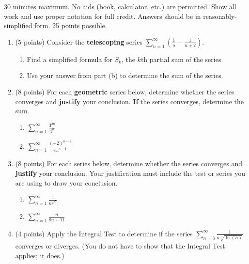 \documentclass[12pt]{article}
\newcommand{\ds}{\displaystyle}
\begin{document}
30 minutes maximum.  No aids (book, calculator, etc.) are permitted.  Show all work and use proper notation for full credit.  Answers should be in reasonably-simplified form.  25 points possible.

\begin{enumerate}
\item (5 points) Consider the \textbf{telescoping} series $\ds \sum_{n=1}^{\infty} \left( \frac{1}{n}- \frac{1}{n+2}\right).$
	\begin{enumerate}
	\item Find a simplified formula for $S_k$, the $k$th partial sum of the series.
	\vfill
	\item Use your answer from part (b) to determine the sum of the series.\\
	\vfill
	\end{enumerate}
\item (8 points) For each \textbf{geometric} series below, determine whether the series converges and \textbf{justify} your conclusion. \textbf{If} the series converges, determine the sum.
	\begin{enumerate}
	\item $\ds \sum_{n=1}^{\infty} \frac{3^{2n}}{4^n}$
	\vfill
	\item $\ds \sum_{n=1}^{\infty} \frac{(-2)^{n-1}}{\pi 5^{n-1}}$
	\vfill
	\end{enumerate}
\newpage
\item (8 points) For each  series below, determine whether the series converges and \textbf{justify} your conclusion. Your justification must include the test or series you are using to draw your conclusion.
	\begin{enumerate}
	\item $\ds \sum_{n=1}^{\infty} \frac{1}{n^{\sqrt{6}}}$
	\vfill
	\item $\ds \sum_{n=1}^{\infty} \frac{n}{8n+11}$
	\vfill
	
	\end{enumerate}
\item (4 points) Apply the Integral Test to determine if the series $\ds \sum_{n=3}^{\infty} \frac{1}{n \sqrt{\ln (n)}}$ converges or diverges. (You do not have to show that the Integral Test applies; it does.)
\vfill
\vfill
\end{enumerate}
\end{document}
